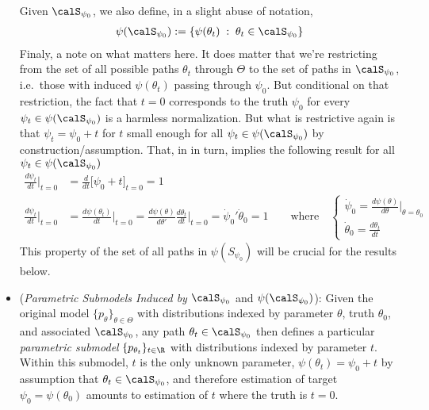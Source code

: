 \documentclass[12pt]{article}
\theoremstyle{plain}
\theoremstyle{definition}
\theoremstyle{remark}
\begin{document}
\begin{itemize}
    Given $\calS_{\psi_0}$, we also define, in a slight abuse of
    notation,
    \begin{align*}
      \psi(\calS_{\psi_0})
      :=
      \{
        \psi(\theta_t)
        \;:\;
        \theta_t\in\calS_{\psi_0}
      \}
    \end{align*}
    Finaly, a note on what matters here.
    It does matter that we're restricting from the set of all possible
    paths $\theta_t$ through $\Theta$ to the set of paths in
    $\calS_{\psi_0}$, i.e.\ those with induced $\psi(\theta_t)$ passing
    through $\psi_0$.
    But conditional on that restriction, the fact that $t=0$ corresponds
    to the truth $\psi_0$ for every $\psi_t\in\psi(\calS_{\psi_0})$ is a
    harmless normalization.
    But what is restrictive again is that $\psi_t=\psi_0+t$ for $t$
    small enough for all $\psi_t\in\psi(\calS_{\psi_0})$ by
    construction/assumption.
    That, in in turn, implies the following result for all
    $\psi_t \in \psi(\calS_{\psi_0})$
    \begin{align*}
      \frac{d\psi_t}{dt}
      \bigg|_{t=0}
      &=
      \frac{d}{dt}
      \big[
        \psi_0+t
      \big]_{t=0}
      =1
      \\
      \frac{d\psi_t}{dt}
      \bigg|_{t=0}
      &=
      \frac{d\psi(\theta_t)}{dt}
      \bigg|_{t=0}
      =
      \frac{d\psi(\theta)}{d\theta'}
      \frac{d\theta_t}{dt}
      \bigg|_{t=0}
      =
      \dot{\psi}_0'
      \dot{\theta}_0
      =
      1
      \qquad\text{where}\quad
      \begin{cases}
        \dot{\psi}_0
        =
        \frac{d\psi(\theta)}{d\theta}
        \bigg|_{\theta=\theta_0}
        \\
        \dot{\theta}_0
        =
        \frac{d\theta_t}{dt}
      \end{cases}
    \end{align*}
    This property of the set of all paths in $\psi(S_{\psi_0})$ will be
    crucial for the results below.

  \item
    (\emph{Parametric Submodels Induced by} $\calS_{\psi_0}$ and $\psi(\calS_{\psi_0})$):
    Given the original model $\{p_{\theta}\}_{\theta\in\Theta}$ with
    distributions indexed by parameter $\theta$, truth $\theta_0$, and
    associated $\calS_{\psi_0}$,
    any path $\theta_t\in\calS_{\psi_0}$ then defines a particular
    \emph{parametric submodel} $\{p_{\theta_t}\}_{t\in \R}$ with
    distributions indexed by parameter $t$.
    Within this submodel, $t$ is the only unknown parameter,
    $\psi(\theta_t)=\psi_0+t$ by assumption that
    $\theta_t\in\calS_{\psi_0}$, and therefore
    estimation of target $\psi_0=\psi(\theta_0)$
    amounts to estimation of $t$ where the truth is $t=0$.


\end{itemize}
\end{document}
